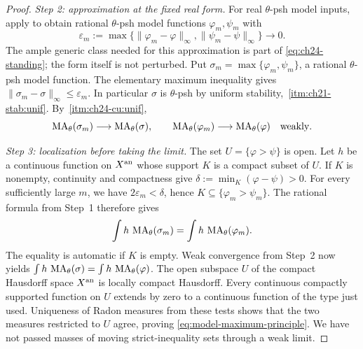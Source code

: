 \begin{proof}
\emph{Step 2: approximation at the fixed real form.}
For real \(\theta\)-psh model inputs, apply
 to obtain rational
\(\theta\)-psh model functions \(\varphi_m,\psi_m\) with
\[
 \varepsilon_m:=\max\{\|\varphi_m-\varphi\|_\infty,
                         \|\psi_m-\psi\|_\infty\}\longrightarrow0.
\]
The ample generic class needed for this approximation is part of
\eqref{eq:ch24-standing}; the form itself is not perturbed.
Put \(\sigma_m=\max\{\varphi_m,\psi_m\}\), a rational
\(\theta\)-psh model function.  The elementary maximum inequality gives
\(\|\sigma_m-\sigma\|_\infty\leq\varepsilon_m\).
In particular \(\sigma\) is \(\theta\)-psh by uniform stability,
\,\cref{itm:ch21-stab:unif}.
By \,\cref{itm:ch24-cu:unif},
\[
 \operatorname{MA}_\theta(\sigma_m)\longrightarrow\operatorname{MA}_\theta(\sigma),
 \qquad
 \operatorname{MA}_\theta(\varphi_m)\longrightarrow\operatorname{MA}_\theta(\varphi)
 \quad\text{weakly}.
\]

\emph{Step 3: localization before taking the limit.}
The set \(U=\{\varphi>\psi\}\) is open.  Let \(h\) be a continuous
function on \(X^{\mathrm{an}}\) whose support \(K\) is a compact subset of
\(U\).  If \(K\) is nonempty, continuity and compactness give
\(\delta:=\min_K(\varphi-\psi)>0\).  For every sufficiently large
\(m\), we have \(2\varepsilon_m<\delta\), hence
\(K\subseteq\{\varphi_m>\psi_m\}\).  The rational formula from
Step~1 therefore gives
\[
 \int h\,\operatorname{MA}_\theta(\sigma_m)
       =\int h\,\operatorname{MA}_\theta(\varphi_m).
\]
The equality is automatic if \(K\) is empty.  Weak convergence from
Step~2 now yields
\(\int h\,\operatorname{MA}_\theta(\sigma)=\int h\,\operatorname{MA}_\theta(\varphi)\).
The open subspace \(U\) of the compact Hausdorff space \(X^{\mathrm{an}}\)
is locally compact Hausdorff.  Every continuous compactly supported
function on \(U\) extends by zero to a continuous function of the type
just used.  Uniqueness of Radon measures from these tests shows that the
two measures restricted to \(U\) agree, proving
\eqref{eq:model-maximum-principle}.  We have not passed masses of moving
strict-inequality sets through a weak limit.
\end{proof}

